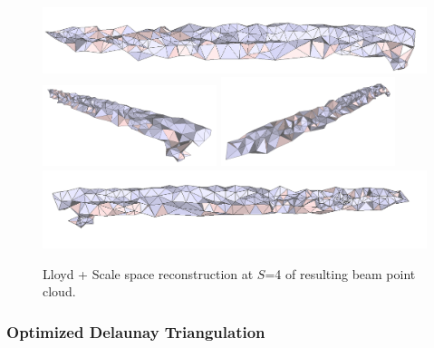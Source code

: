 \documentclass[12pt]{drexelthesis}
\let\Oldsubsubsection\subsubsection
\renewcommand{\subsubsection}{\FloatBarrier\Oldsubsubsection}
\begin{document}
\begin{figure}[!ht]
	\centering
		\includegraphics[width=5in]{real-lab-scans/optimizedNeat/scalespace4lloyd00.png}
		\includegraphics[width=2in]{real-lab-scans/optimizedNeat/scalespace4lloyd01.png}
		\includegraphics[width=2in]{real-lab-scans/optimizedNeat/scalespace4lloyd02.png}
		\includegraphics[width=5in]{real-lab-scans/optimizedNeat/scalespace4lloyd03.png}
		\caption[Lloyd + Scale space reconstruction at $S$=4 of segmented LiDAR data]{\centering Lloyd + Scale space reconstruction at $S$=4 of resulting beam point cloud.}
	\label{lidar:scalespace4lloyd}
\end{figure}


\subsubsection{Optimized Delaunay Triangulation}
\end{document}
